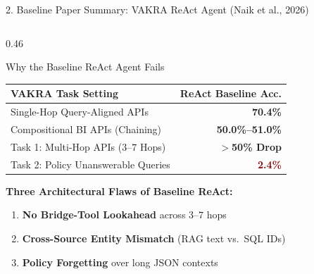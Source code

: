 \documentclass[aspectratio=169, 10pt]{beamer}
\begin{document}
\begin{frame}{2. Baseline Paper Summary: VAKRA ReAct Agent (Naik et al., 2026)}
\begin{columns}[T, onlytextwidth]
\begin{column}{0.46\textwidth}
\begin{alertblock}{\small Why the Baseline ReAct Agent Fails}
\scriptsize
\begin{tabularx}{\textwidth}{X r}
\toprule
\textbf{VAKRA Task Setting} & \textbf{ReAct Baseline Acc.} \\
\midrule
Single-Hop Query-Aligned APIs & \textbf{70.4\%} \\
Compositional BI APIs (Chaining) & \textbf{50.0\%--51.0\%} \\
Task 1: Multi-Hop APIs ($3\text{--}7$ Hops) & \textbf{$>$50\% Drop} \\
Task 2: Policy Unanswerable Queries & \textcolor{darkred}{\textbf{2.4\%}} \\
\bottomrule
\end{tabularx}
\vspace{0.08cm}
\textbf{Three Architectural Flaws of Baseline ReAct:}
\begin{enumerate}
    \setlength{\itemsep}{1pt}
    \item \textbf{No Bridge-Tool Lookahead} across $3\text{--}7$ hops
    \item \textbf{Cross-Source Entity Mismatch} (RAG text vs.\ SQL IDs)
    \item \textbf{Policy Forgetting} over long JSON contexts
\end{enumerate}
\end{alertblock}
\end{column}
\end{columns}
\end{frame}
\end{document}
